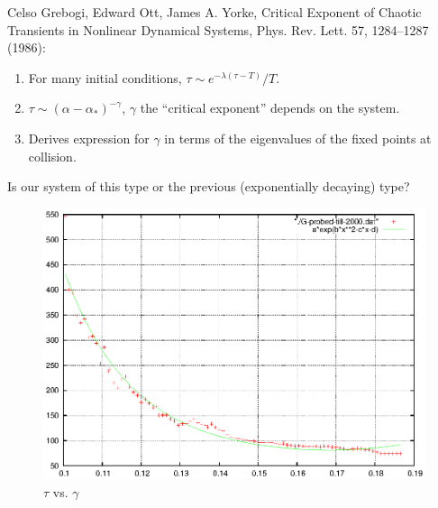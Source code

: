 \documentclass[xcolor=x11names,compress]{beamer}
\newenvironment{colbox}[1]
  {\newcommand\colboxcolor{#1}%
   \begin{lrbox}{\selvestebox}%
   \begin{minipage}{\dimexpr\columnwidth-2\fboxsep\relax}}
  {\end{minipage}\end{lrbox}%
   \begin{center}
   \colorbox[HTML]{\colboxcolor}{\usebox{\selvestebox}}
   \end{center}}
\renewcommand{\(}{\begin{columns}}
\renewcommand{\)}{\end{columns}}
\newcommand{\<}[1]{\begin{column}{#1}}
\renewcommand{\>}{\end{column}}
\begin{document}
\begin{frame}
Celso Grebogi, Edward Ott, James A.   Yorke, Critical Exponent of 
Chaotic Transients in Nonlinear Dynamical Systems, Phys.   Rev.   Lett.   57, 
1284–1287 (1986):

\begin{colbox}{E6E6E6}{}
\begin{enumerate}
\item For many initial conditions, $\tau\sim e^{-\lambda(\tau-T)}/T$.  
\item $\tau\sim(\alpha-\alpha_*)^{-\gamma}$, $\gamma$ the ``critical 
exponent'' depends on the system.  
\item Derives expression for $\gamma$ in terms of the eigenvalues of the fixed 
points at collision.  


\end{enumerate}
\end{colbox}

Is our system of this type or the previous (exponentially decaying) type?

\end{frame}

\begin{frame}

\begin{figure}
\caption{$\tau$ vs.  $\gamma$}
\begin{center}
\includegraphics[width=0.9\columnwidth]{fit-gaussian-G-probe}
\end{center}
\end{figure}
\end{frame}
\end{document}
